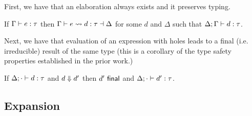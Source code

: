 First, we have that an elaboration always exists and it preserves typing.
\begin{theorem}
    If $\Gamma \vdash e : \tau$ then $\Gamma \vdash e \leadsto d : \tau \dashv \Delta$ for some $d$ and $\Delta$ such 
    that $\Delta; \Gamma \vdash d : \tau$. 
\end{theorem}

Next, we have that evaluation of an expression with holes leads to a final (i.e. irreducible) result of the same type (this is a corollary
of the type safety properties established in the prior work.)
\begin{theorem}[Preservation]
    If $\Delta; \cdot \vdash d : \tau$ and $d \Downarrow d'$ then $d'~\mathsf{final}$ and $\Delta; \cdot \vdash d' : \tau$.
\end{theorem}

\subsection{Expansion}

